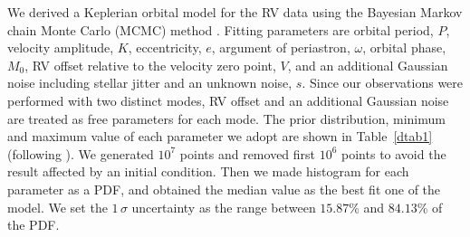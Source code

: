 \documentclass[]{pasj01}
\begin{document}
We derived a Keplerian orbital model for the RV data using the Bayesian Markov chain Monte Carlo (MCMC) method \citep{Gregory2005}.
Fitting parameters are orbital period, $P$, velocity amplitude, $K$, eccentricity, $e$, argument of periastron, $\omega$, orbital phase, $M_0$, RV offset relative to the velocity zero point, $V$, and an additional Gaussian noise including stellar jitter and an unknown noise, $s$.
Since our observations were performed with two distinct modes, RV offset and an additional Gaussian noise are treated as free parameters for each mode.
The prior distribution, minimum and maximum value of each parameter we adopt are shown in Table~\ref{dtab1} (following \cite{Sato2013a}).
We generated $10^7$ points and removed first $10^6$ points to avoid the result affected by an initial condition.
Then we made histogram for each parameter as a PDF, and obtained the median value as the best fit one of the model.
We set the $1\,\sigma$ uncertainty as the range between $15.87$\% and $84.13$\% of the PDF.

\begin{table}
\label{dtab1}
\end{table}

\end{document}
